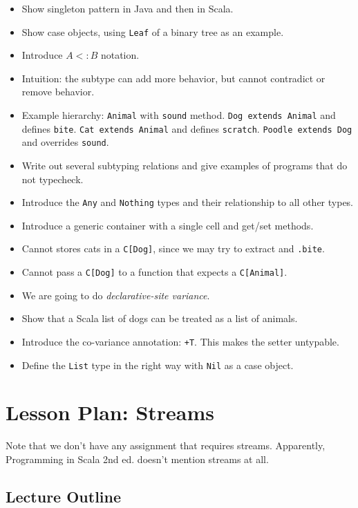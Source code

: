 \documentclass[9pt]{extbook}
\begin{document}
\begin{itemize}

  \item Show singleton pattern in Java and then in Scala.
  \item Show case objects, using \lstinline|Leaf| of a binary tree as an example.
  \item Introduce $A <: B$ notation.
  \item Intuition: the subtype can add more behavior, but cannot contradict or remove behavior.
  \item Example hierarchy: \lstinline|Animal| with \lstinline|sound| method. \lstinline|Dog extends Animal| and defines \lstinline|bite|.
    \lstinline|Cat extends Animal| and defines \lstinline|scratch|. \lstinline|Poodle extends Dog| and overrides \lstinline|sound|.
  \item Write out several subtyping relations and give examples of programs that do not typecheck.
  \item Introduce the \lstinline|Any| and \lstinline|Nothing| types and their relationship to all other types.
  \item Introduce a generic container with a single cell and get/set methods.
  \item Cannot stores cats in a \lstinline|C[Dog]|, since we may try to extract and \lstinline|.bite|.
  \item Cannot pass a \lstinline|C[Dog]| to a function that expects a \lstinline|C[Animal]|.
  \item We are going to do \emph{declarative-site variance}.
  \item Show that a Scala list of dogs can be treated as a list of animals.
  \item Introduce the co-variance annotation: \lstinline|+T|. This makes the setter untypable.
  \item Define the \lstinline|List| type in the right way with \lstinline|Nil| as a case object.
  \end{itemize}

\chapter{Lesson Plan: Streams}

Note that we don't have any assignment that requires
streams. Apparently, Programming in Scala 2nd ed. doesn't mention
streams at all.
   
\section*{Lecture Outline}
\end{document}
